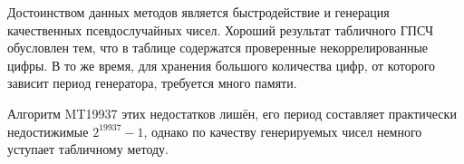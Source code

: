 \documentclass[a4paper,oneside,12pt]{extreport}
\begin{document}
Достоинством данных методов является быстродействие и генерация качественных псевдослучайных чисел.
Хороший результат табличного ГПСЧ обусловлен тем, что в таблице содержатся проверенные некоррелированные цифры.
В то же время, для хранения большого количества цифр, от которого зависит период генератора, требуется много памяти.

Алгоритм MT19937 этих недостатков лишён, его период составляет практически недостижимые $2^{19937} - 1$, однако по качеству генерируемых чисел немного уступает табличному методу.
\end{document}
